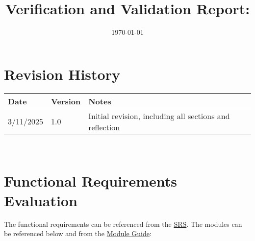 \documentclass[12pt, titlepage]{article}
\begin{document}
\title{Verification and Validation Report: \progname} 
\author{\authname}
\date{\today}
	
\maketitle


\section{Revision History}

\begin{tabularx}{\textwidth}{p{3cm}p{2cm}X}
\toprule {\bf Date} & {\bf Version} & {\bf Notes}\\
\midrule
3/11/2025 & 1.0 & Initial revision, including all sections and reflection\\
\bottomrule
\end{tabularx}

~\newpage




\newpage

\tableofcontents

\listoftables %

\newpage


\newpage

\section{Functional Requirements Evaluation}

The functional requirements can be referenced from the \href{https://github.com/ausbennett/mes-finance-platform/blob/main/docs/SRS/SRS.pdf}{SRS}. The modules can be referenced below and from the \href{https://github.com/ausbennett/mes-finance-platform/blob/main/docs/Design/SoftArchitecture/MG.pdf}{Module Guide}:
\end{document}
